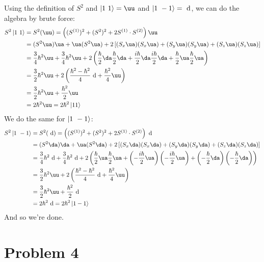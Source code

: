 \documentclass[10pt]{article}
\begin{document}
\begin{enumerate}[(a)]
        \begin{solution}
            Using the definition of $S^2$ and $\ket{1 \ 1} = \uu$ and $\ket{1 \ -1} = \ \mathrm d$, we can do the algebra by brute force:
                \begin{align*}
                    S^2\ket{1 \ 1} &= S^2(\uu) = \left((S^{(1)})^2 + (S^{2})^2 + 2S^{(1)}\cdot S^{(2)}\right)\uu \\ 
                    &= (S^2\ua)\ua + \ua(S^2\ua) + 2\left[(S_x\ua)(S_x\ua) + (S_y\ua)(S_y\ua) +(S_z\ua)(S_z\ua)\right] \\
                    &= \frac34\hbar^2\uu + \frac34\hbar^2\uu + 2\left(\frac{\hbar}{2}\da\frac{\hbar}{2}\da + \frac{i\hbar}{2}\da\frac{i\hbar}{2}\da + \frac{\hbar}{2}\ua\frac{\hbar}{2}\ua\right) \\
                    &= \frac32\hbar^2\uu + 2\left(\frac{\hbar^2 - \hbar^2}{4}\dd + \frac{\hbar^2}{4}\uu\right)\\
                    & = \frac32\hbar^2\uu + \frac{\hbar^2}{2}\uu\\
                    &=  2\hbar^2\uu = 2\hbar^2\ket{1 1}
                \end{align*}
                We do the same for $\ket{1 \ -1}$:
                \begin{align*}
                    S^2\ket{1 \ -1} &= S^2(\dd) = \left((S^{(1)})^2 + (S^{2})^2 + 2S^{(1)}\cdot S^{(2)}\right)\dd \\
                    &= (S^2\da)\da + \ua(S^2\da) + 2\left[(S_x\da)(S_x\da) + (S_y\da)(S_y\da) +(S_z\da)(S_z\da)\right] \\ 
                    &= \frac34\hbar^2\dd + \frac34\hbar^2\dd + 2\left(\frac{\hbar}{2}\ua\frac{\hbar}{2}\ua + \left(-\frac{i\hbar}{2}\ua\right)\left(-\frac{i\hbar}{2}\ua\right) + \left(-\frac{\hbar}{2}\da\right)\left(-\frac{\hbar}{2}\da\right)\right) \\
                    &= \frac32\hbar^2\uu + 2\left(\frac{\hbar^2 - \hbar^2}{4}\dd + \frac{\hbar^2}{4}\uu\right)\\
                    &= \frac32\hbar^2\uu + \frac{\hbar^2}{2}\dd\\
                    &= 2\hbar^2\dd = 2\hbar^2\ket{1 -1}
                \end{align*}
                And so we're done.
        \end{solution}
    \end{enumerate}

    \pagebreak

    \section*{Problem 4}
\end{document}
